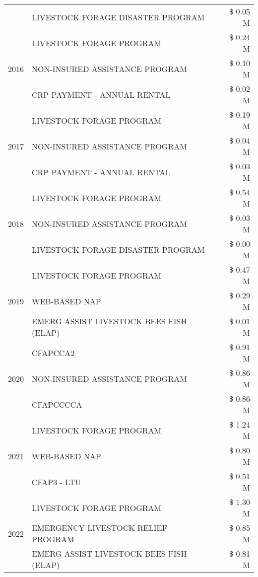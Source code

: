\begin{tabular}{llr}
 & LIVESTOCK FORAGE DISASTER PROGRAM & \$ 0.05 M \\
\cline{1-3}
\multirow[t]{3}{*}{2016} & LIVESTOCK FORAGE PROGRAM & \$ 0.24 M \\
 & NON-INSURED ASSISTANCE PROGRAM & \$ 0.10 M \\
 & CRP PAYMENT - ANNUAL RENTAL & \$ 0.02 M \\
\cline{1-3}
\multirow[t]{3}{*}{2017} & LIVESTOCK FORAGE PROGRAM & \$ 0.19 M \\
 & NON-INSURED ASSISTANCE PROGRAM & \$ 0.04 M \\
 & CRP PAYMENT - ANNUAL RENTAL & \$ 0.03 M \\
\cline{1-3}
\multirow[t]{3}{*}{2018} & LIVESTOCK FORAGE PROGRAM & \$ 0.54 M \\
 & NON-INSURED ASSISTANCE PROGRAM & \$ 0.03 M \\
 & LIVESTOCK FORAGE DISASTER PROGRAM & \$ 0.00 M \\
\cline{1-3}
\multirow[t]{3}{*}{2019} & LIVESTOCK FORAGE PROGRAM & \$ 0.47 M \\
 & WEB-BASED NAP & \$ 0.29 M \\
 & EMERG ASSIST LIVESTOCK BEES FISH (ELAP) & \$ 0.01 M \\
\cline{1-3}
\multirow[t]{3}{*}{2020} & CFAPCCA2 & \$ 0.91 M \\
 & NON-INSURED ASSISTANCE PROGRAM & \$ 0.86 M \\
 & CFAPCCCCA & \$ 0.86 M \\
\cline{1-3}
\multirow[t]{3}{*}{2021} & LIVESTOCK FORAGE PROGRAM & \$ 1.24 M \\
 & WEB-BASED NAP & \$ 0.80 M \\
 & CFAP3 - LTU & \$ 0.51 M \\
\cline{1-3}
\multirow[t]{3}{*}{2022} & LIVESTOCK FORAGE PROGRAM & \$ 1.30 M \\
 & EMERGENCY LIVESTOCK RELIEF PROGRAM & \$ 0.85 M \\
 & EMERG ASSIST LIVESTOCK BEES FISH (ELAP) & \$ 0.81 M \\
\cline{1-3}
\bottomrule
\end{tabular}
